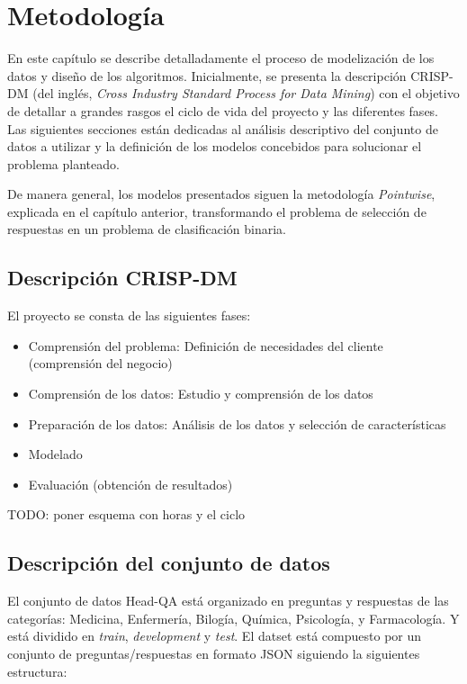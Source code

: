 \chapter{Metodología}\label{chapter:methods}

En este capítulo se describe detalladamente el proceso de modelización de los datos y diseño de los algoritmos. Inicialmente, se presenta la descripción CRISP-DM (del inglés, \textit{Cross Industry Standard Process for Data Mining}) con el objetivo de detallar a grandes rasgos el ciclo de vida del proyecto y las diferentes fases. Las siguientes secciones están dedicadas al análisis descriptivo del conjunto de datos a utilizar y la definición de los modelos concebidos para solucionar el problema planteado. 

De manera general, los modelos presentados siguen la metodología \textit{Pointwise}, explicada en el capítulo anterior, transformando el problema de selección de respuestas en un problema de clasificación binaria.

\section{Descripción CRISP-DM}

El proyecto se consta de las siguientes fases:

\begin{itemize}
  \item Comprensión del problema: Definición de necesidades del cliente (comprensión del negocio)
  \item Comprensión de los datos: Estudio y comprensión de los datos
  \item Preparación de los datos: Análisis de los datos y selección de características
  \item Modelado
  \item Evaluación (obtención de resultados)
\end{itemize}

TODO: poner esquema con horas y el ciclo


\section{Descripción del conjunto de datos}

El conjunto de datos Head-QA está organizado en preguntas y respuestas de las categorías: Medicina, Enfermería, Bilogía, Química, Psicología, y Farmacología. Y está dividido en \textit{train}, \textit{development} y \textit{test}. El datset está compuesto por un conjunto de preguntas/respuestas en formato JSON siguiendo la siguientes estructura:

